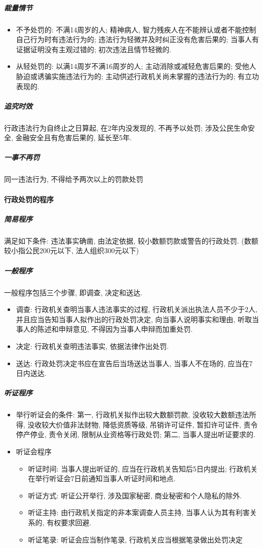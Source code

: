 \subparagraph{裁量情节}

\begin{itemize}
    \item 不予处罚的: 不满14周岁的人; 精神病人, 智力残疾人在不能辨认或者不能控制自己行为时有违法行为的; 违法行为轻微并及时纠正没有危害后果的; 当事人有证据证明没有主观过错的; 初次违法且情节轻微的.
    \item 从轻处罚的: 以满14周岁不满16周岁的人; 主动消除或减轻危害后果的; 受他人胁迫或诱骗实施违法行为的; 主动供述行政机关尚未掌握的违法行为的; 有立功表现的.
\end{itemize}

\subparagraph{追究时效} 行政违法行为自终止之日算起, 在2年内没发现的, 不再予以处罚; 涉及公民生命安全, 金融安全且有危害后果的, 延长至5年.

\subparagraph{一事不再罚} 同一违法行为, 不得给予两次以上的罚款处罚

\paragraph{行政处罚的程序}

\subparagraph{简易程序} 满足如下条件: 违法事实确凿, 由法定依据, 较小数额罚款或警告的行政处罚. (数额较小指公民200元以下, 法人组织300元以下)

\subparagraph{一般程序} 一般程序包括三个步骤, 即调查, 决定和送达.

\begin{itemize}
    \item 调查: 行政机关查明当事人违法事实的过程, 行政机关派出执法人员不少于2人, 并且应当告知当事人拟作出的行政处罚决定, 向当事人说明事实和理由, 听取当事人的陈述和申辩意见, 不得因为当事人申辩而加重处罚.
    \item 决定: 行政机关查明违法事实, 依据法律作出处罚.
    \item 送达: 行政处罚决定书应在宣告后当场送达当事人, 当事人不在场的, 应当在7日内送达.
\end{itemize}

\subparagraph{听证程序}

\begin{itemize}
    \item 举行听证会的条件: 第一, 行政机关拟作出较大数额罚款, 没收较大数额违法所得, 没收较大价值非法财物, 降低资质等级, 吊销许可证件, 暂扣许可证件, 责令停产停业, 责令关闭, 限制从业资格等行政处罚; 第二, 当事人提出听证要求的.
    \item 听证会程序
    \begin{itemize}
        \item 听证时间: 当事人提出听证的, 应当在行政机关告知后5日内提出; 行政机关在举行听证会7日前通知当事人听证时间和地点.
        \item 听证方式: 听证公开举行, 涉及国家秘密, 商业秘密和个人隐私的除外.
        \item 听证主持: 由行政机关指定的非本案调查人员主持, 当事人认为其有利害关系的, 有权要求回避.
        \item 听证笔录: 听证会应当制作笔录, 行政机关应当根据笔录做出处罚决定
    \end{itemize} 
\end{itemize}

